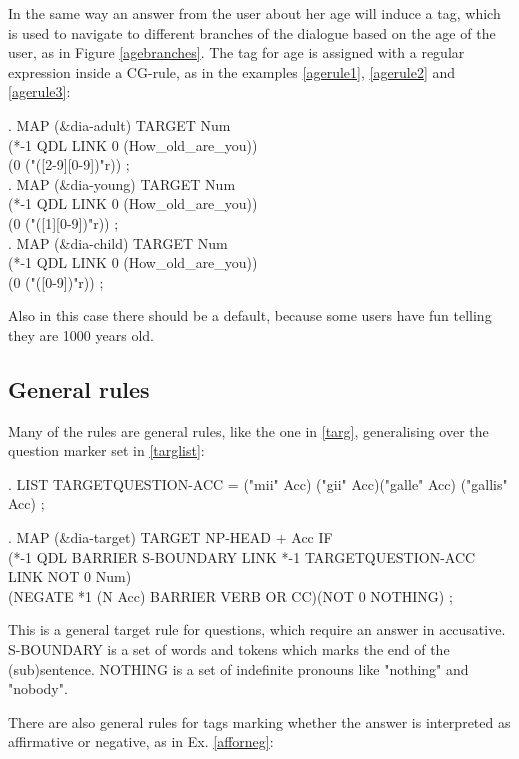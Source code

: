 \documentclass[11pt]{article}
\begin{document}
In the same way an answer from the user about her age will induce a tag, which is used to navigate to different branches of the dialogue based on the age of the user, as in Figure \ref{agebranches}. The tag for age is assigned with a regular expression inside a CG-rule, as in the examples \ref{agerule1}, \ref{agerule2} and \ref{agerule3}: 

\ex.\flushleft\label{agerule1}  \small{MAP (\&dia-adult) TARGET Num \\(*-1 QDL LINK 0 (How\_old\_are\_you)) \\ (0 ("([2-9][0-9])"r)) ;} \\

\ex.\flushleft\label{agerule2} \small{MAP (\&dia-young) TARGET Num \\(*-1 QDL LINK 0 (How\_old\_are\_you))\\ (0 ("([1][0-9])"r)) ;} \\

\ex.\flushleft\label{agerule3} \small{MAP (\&dia-child) TARGET Num \\(*-1 QDL LINK 0 (How\_old\_are\_you)) \\(0 ("([0-9])"r)) ;} 


Also in this case there should be a default, because some users have fun telling they are 1000 years old.

\subsection{General rules} 
Many of the rules are general rules, like the one in \ref{targ}, generalising over the question marker set in \ref{targlist}:

\ex.\flushleft\label{targlist} \small{LIST TARGETQUESTION-ACC = ("mii" Acc) ("gii" Acc)("galle" Acc) ("gallis" Acc) ;}

\ex.\flushleft\label{targ} \small{MAP (\&dia-target) TARGET NP-HEAD + Acc IF \\
(*-1 QDL BARRIER S-BOUNDARY LINK *-1 TARGETQUESTION-ACC LINK NOT 0 Num)\\
(NEGATE *1 (N Acc) BARRIER VERB OR CC)(NOT 0 NOTHING) ;}

This is a general target rule for questions, which require an answer in accusative. S-BOUNDARY is a set of words and tokens which marks the end of the (sub)sentence. NOTHING is a set of indefinite pronouns like "nothing" and "nobody". 

There are also general rules for tags marking whether the answer is interpreted as affirmative or negative, as in Ex. \ref{afforneg}:
\end{document}
